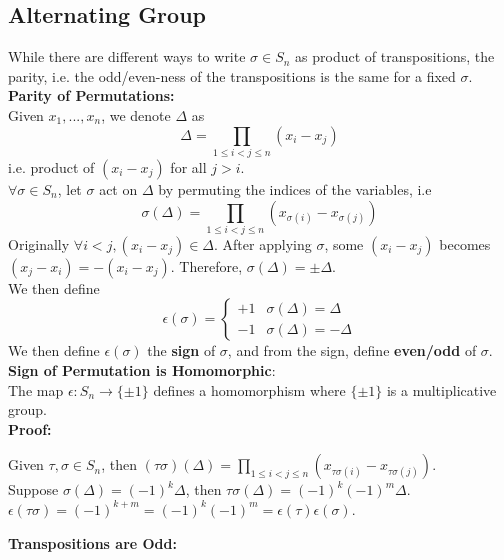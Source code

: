 \documentclass{article}
\begin{document}
\subsection{Alternating Group}
While there are different ways to write $\sigma \in S_n$ as product of transpositions, the parity, i.e. the odd/even-ness of the transpositions is the same for a fixed $\sigma$.\\
\textbf{Parity of Permutations:}\\
Given $x_1, ..., x_n$, we denote $\Delta$ as
\begin{equation*}
    \Delta = \prod_{1\leq i < j \leq n} (x_i - x_j)
\end{equation*}
i.e. product of $(x_i - x_j)$ for all $j > i$.\\
$\forall \sigma \in S_n$, let $\sigma$ act on $\Delta$ by permuting the indices of the variables, i.e
\begin{equation*}
    \sigma(\Delta) = \prod_{1\leq i < j \leq n} (x_{\sigma(i)} - x_{\sigma(j)})
\end{equation*}
Originally $\forall i < j, (x_i - x_j) \in \Delta$. After applying $\sigma$, some $(x_i-x_j)$ becomes $(x_j - x_i) = -(x_i - x_j)$. Therefore, $\sigma(\Delta) = \pm \Delta$.\\
We then define
\begin{equation*}
    \epsilon(\sigma) = \begin{cases}
    \plus 1 & \sigma(\Delta) = \Delta \\
    -1 & \sigma(\Delta) = -\Delta
    \end{cases}
\end{equation*}
We then define $\epsilon(\sigma)$ the \textbf{sign} of $\sigma$, and from the sign, define \textbf{even/odd} of $\sigma$.
\textbf{Sign of Permutation is Homomorphic}:\\
The map $\epsilon:S_n \rightarrow \{\pm 1\}$ defines a homomorphism where $\{\pm 1\}$ is a multiplicative group.\\
\textbf{Proof:}
\begin{addmargin}[1em]{0em}
Given $\tau, \sigma \in S_n$, then $(\tau\sigma)(\Delta) = \prod_{1 \leq i < j \leq n}(x_{\tau\sigma(i)} - x_{\tau\sigma(j)})$.\\
Suppose $\sigma(\Delta) = (-1)^k\Delta$, then $\tau\sigma(\Delta) = (-1)^k(-1)^m\Delta$.\\
$\epsilon(\tau\sigma) = (-1)^{k+m} = (-1)^k(-1)^m = \epsilon(\tau)\epsilon(\sigma)$.
\end{addmargin}
\textbf{Transpositions are Odd:}\\
\end{document}
